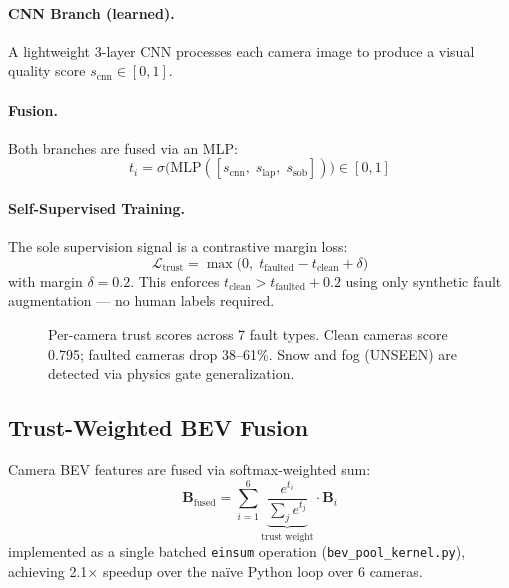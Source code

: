 \documentclass[10pt,twocolumn]{article}
\begin{document}
\paragraph{CNN Branch (learned).}
A lightweight 3-layer CNN processes each camera image to produce a
visual quality score $s_{\text{cnn}} \in [0,1]$.

\paragraph{Fusion.}
Both branches are fused via an MLP:
\begin{equation}
  t_i = \sigma\bigl(\text{MLP}([s_{\text{cnn}},\; s_{\text{lap}},\; s_{\text{sob}}])\bigr) \in [0,1]
\end{equation}

\paragraph{Self-Supervised Training.}
The sole supervision signal is a contrastive margin loss:
\begin{equation}
  \mathcal{L}_{\text{trust}} = \max\bigl(0,\; t_{\text{faulted}} - t_{\text{clean}} + \delta\bigr)
  \label{eq:trust_loss}
\end{equation}
with margin $\delta = 0.2$. This enforces $t_{\text{clean}} > t_{\text{faulted}} + 0.2$
using only synthetic fault augmentation --- no human labels required.

\begin{figure}[h]
\centering
{}
\caption{Per-camera trust scores across 7 fault types. Clean cameras
score 0.795; faulted cameras drop 38--61\%. Snow and fog
(\textcolor{mypurple}{UNSEEN}) are detected via physics gate
generalization.}
\label{fig:trust}
\end{figure}

\subsection{Trust-Weighted BEV Fusion}

Camera BEV features are fused via softmax-weighted sum:
\begin{equation}
  \mathbf{B}_{\text{fused}} = \sum_{i=1}^{6}
    \underbrace{\frac{e^{t_i}}{\sum_j e^{t_j}}}_{\text{trust weight}}
    \cdot \mathbf{B}_i
\end{equation}
implemented as a single batched \texttt{einsum} operation
(\texttt{bev\_pool\_kernel.py}), achieving 2.1$\times$ speedup over
the na\"ive Python loop over 6 cameras.
\end{document}

